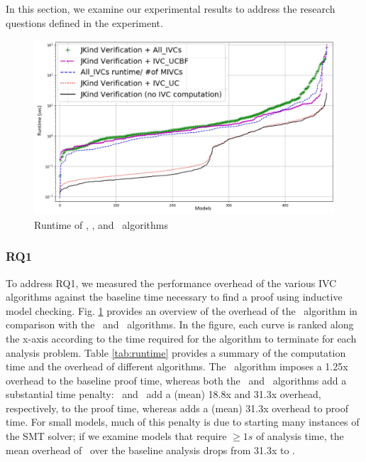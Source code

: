 

In this section, we examine our
experimental results to address the research questions defined in the experiment.

\begin{figure}
 \centering
  \includegraphics[width=\columnwidth]{figs/performance.jpg}
  \vspace{-0.2in}
  \caption{Runtime of \aivcalg, \ucbfalg, and \ucalg ~algorithms}
  \label{fig:performance}
  \vspace{-0.2in}
\end{figure}

\subsubsection{RQ1}

To address RQ1, we measured the performance overhead of the various IVC algorithms against the baseline time
necessary to find a proof using inductive model checking. Fig. \ref{fig:performance} provides an overview of the  overhead of the \aivcalg ~algorithm in comparison with the \ucalg ~and \ucbfalg\ algorithms.  In the figure, each curve is ranked along the x-axis according to the time required for the algorithm to terminate for each analysis problem.
Table \ref{tab:runtime} provides a summary of the computation time and the overhead of different algorithms.  The \ucalg\ algorithm imposes a 1.25x overhead to the baseline proof time, whereas both the \ucbfalg\ and \aivcalg\ algorithms add a substantial time penalty: \ucbfalg\ and \aivcalg\ add a (mean) 18.8x and 31.3x overhead, respectively, to the proof time, whereas \aivcalg adds a (mean) 31.3x overhead to proof time.
For small models, much of this penalty is due to starting many instances of the SMT solver; if we examine models that require $\geq 1s$ of analysis time, the mean overhead of \aivcalg\ over the baseline analysis drops from 31.3x to
.

